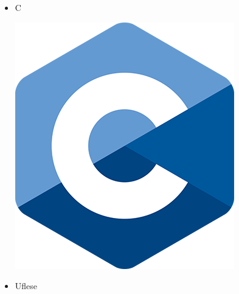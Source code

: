\documentclass{beamer}
\begin{document}
\begin{frame}
\begin{itemize}
    \item \begin{minipage}[t]{0.8\linewidth}C\end{minipage}\begin{minipage}[t]{0.1\linewidth}\includegraphics[width=\linewidth]{Images/C_Logo.png}\end{minipage}
    \vspace{0.5cm}
    \item Uflese
\end{itemize}

\end{frame}
\end{document}
